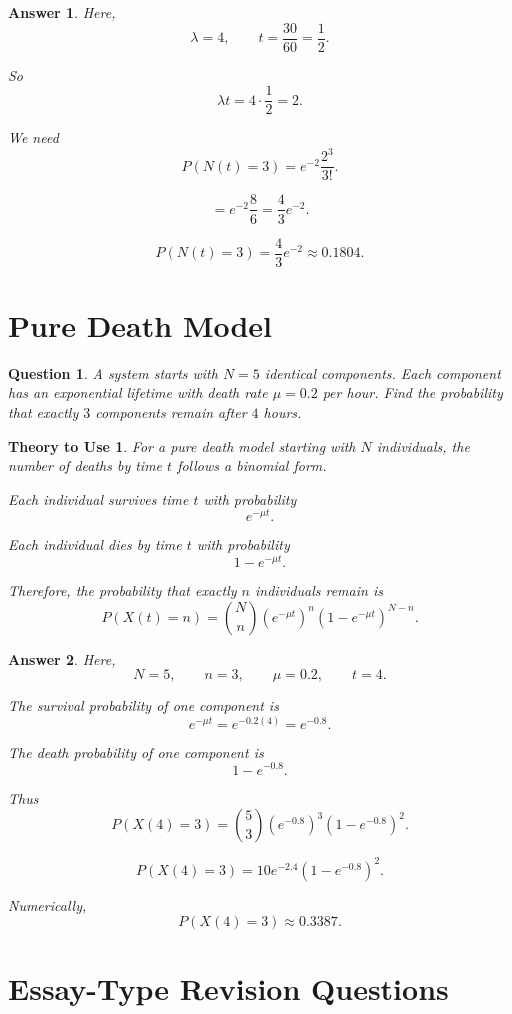\documentclass[12pt]{article}
\newtheorem{question}{Question}
\newtheorem*{theory}{Theory to Use}
\newtheorem*{answer}{Answer}
\begin{document}
\begin{answer}
Here,
\[
\lambda=4,\qquad t=\frac{30}{60}=\frac{1}{2}.
\]

So
\[
\lambda t=4\cdot \frac{1}{2}=2.
\]

We need
\[
P(N(t)=3)=e^{-2}\frac{2^3}{3!}.
\]

\[
=e^{-2}\frac{8}{6}
=\frac{4}{3}e^{-2}.
\]

\[
\boxed{P(N(t)=3)=\frac{4}{3}e^{-2}\approx 0.1804.}
\]
\end{answer}

\section{Pure Death Model}

\begin{question}
A system starts with \(N=5\) identical components. Each component has an exponential lifetime with death rate \(\mu=0.2\) per hour.
Find the probability that exactly \(3\) components remain after \(4\) hours.
\end{question}

\begin{theory}
For a pure death model starting with \(N\) individuals, the number of deaths by time \(t\) follows a binomial form.

Each individual survives time \(t\) with probability
\[
e^{-\mu t}.
\]

Each individual dies by time \(t\) with probability
\[
1-e^{-\mu t}.
\]

Therefore, the probability that exactly \(n\) individuals remain is
\[
P(X(t)=n)=\binom{N}{n}\left(e^{-\mu t}\right)^n
\left(1-e^{-\mu t}\right)^{N-n}.
\]
\end{theory}

\begin{answer}
Here,
\[
N=5,\qquad n=3,\qquad \mu=0.2,\qquad t=4.
\]

The survival probability of one component is
\[
e^{-\mu t}=e^{-0.2(4)}=e^{-0.8}.
\]

The death probability of one component is
\[
1-e^{-0.8}.
\]

Thus
\[
P(X(4)=3)
=\binom{5}{3}(e^{-0.8})^3(1-e^{-0.8})^2.
\]

\[
\boxed{P(X(4)=3)=10e^{-2.4}(1-e^{-0.8})^2.}
\]

Numerically,
\[
\boxed{P(X(4)=3)\approx 0.3387.}
\]
\end{answer}

\section*{Essay-Type Revision Questions}
\end{document}
